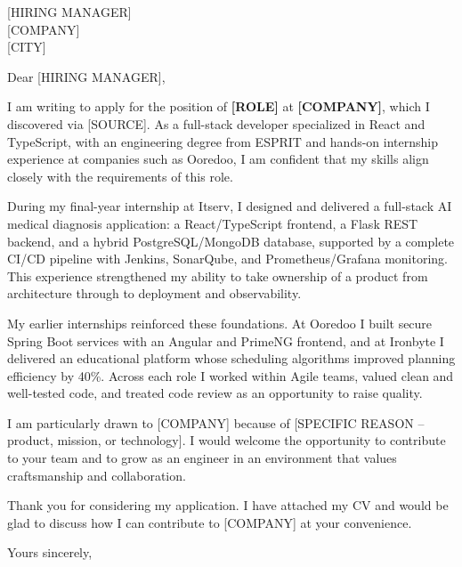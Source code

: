 \documentclass[11pt,a4paper]{letter}
\begin{document}
\begin{letter}{
    {[HIRING MANAGER]} \\
    {[COMPANY]} \\
    {[CITY]}
}

\opening{Dear [HIRING MANAGER],}

I am writing to apply for the position of \textbf{[ROLE]} at \textbf{[COMPANY]}, which I
discovered via [SOURCE]. As a full-stack developer specialized in React and TypeScript,
with an engineering degree from ESPRIT and hands-on internship experience at companies such
as Ooredoo, I am confident that my skills align closely with the requirements of this role.

During my final-year internship at Itserv, I designed and delivered a full-stack AI medical
diagnosis application: a React/TypeScript frontend, a Flask REST backend, and a hybrid
PostgreSQL/MongoDB database, supported by a complete CI/CD pipeline with Jenkins, SonarQube,
and Prometheus/Grafana monitoring. This experience strengthened my ability to take ownership
of a product from architecture through to deployment and observability.

My earlier internships reinforced these foundations. At Ooredoo I built secure Spring Boot
services with an Angular and PrimeNG frontend, and at Ironbyte I delivered an educational
platform whose scheduling algorithms improved planning efficiency by 40\%. Across each role I
worked within Agile teams, valued clean and well-tested code, and treated code review as an
opportunity to raise quality.

I am particularly drawn to [COMPANY] because of [SPECIFIC REASON -- product, mission, or
technology]. I would welcome the opportunity to contribute to your team and to grow as an
engineer in an environment that values craftsmanship and collaboration.

Thank you for considering my application. I have attached my CV and would be glad to discuss
how I can contribute to [COMPANY] at your convenience.

\closing{Yours sincerely,}

\end{letter}
\end{document}
